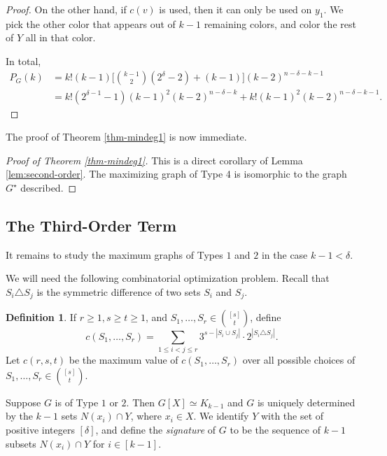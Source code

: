\documentclass[11pt]{article}
\theoremstyle{plain}
\theoremstyle{definition}
\newtheorem{definition}[theorem]{Definition}
\theoremstyle{remark}
\begin{document}
\begin{proof}
On the other hand, if $c(v)$ is used, then it can only be used on $y_1$. We pick the other color that appears out of $k-1$ remaining colors, and color the rest of $Y$ all in that color.

In total,
\begin{align*}
P_G(k) & = k!(k-1)\Big[{k-1 \choose 2} (2^\delta - 2) + (k-1)\Big](k-2)^{n-\delta-k-1} \\
& = k!(2^{\delta -1} - 1)(k-1)^2(k-2)^{n-\delta-k} + k!(k-1)^2(k-2)^{n-\delta-k-1}.
\end{align*}
\end{proof}

The proof of Theorem \ref{thm-mindeg1} is now immediate. 

\begin{proof}[Proof of Theorem \ref{thm-mindeg1}]
This is a direct corollary of Lemma \ref{lem:second-order}. The maximizing graph of Type 4 is isomorphic to the graph $G^\star$ described.
\end{proof}

\subsection{The Third-Order Term}
It remains to study the maximum graphs of Types $1$ and $2$ in the case $k-1 < \delta$.

We will need the following combinatorial optimization problem. Recall that $S_i \triangle S_j$ is the symmetric difference of two sets $S_i$ and $S_j$.

\begin{definition}
If $r\ge 1, s\ge t \ge 1$, and $S_1,\ldots, S_r\in {[s] \choose t}$, define
\[
c(S_1,\ldots ,S_r) = \sum_{1\le i < j \le r} 3^{s - |S_i \cup S_j|} \cdot 2^{|S_i \triangle S_j|}.
\]
Let $c(r, s, t)$ be the maximum value of $c(S_1,\ldots ,S_r)$ over all possible choices of $S_1,\ldots, S_r \in {[s] \choose t}$.
\end{definition}

Suppose $G$ is of Type $1$ or $2$. Then $G[X]\simeq K_{k-1}$ and $G$ is uniquely determined by the $k-1$ sets $N(x_i)\cap Y$, where $x_i\in X$. We identify $Y$ with the set of positive integers $[\delta]$, and define the \textit{signature} of $G$ to be the sequence of $k-1$ subsets $N(x_i)\cap Y$ for $i \in [k-1]$. 
\end{document}

